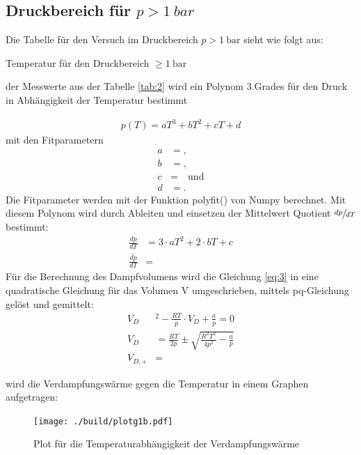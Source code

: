 \subsection{Druckbereich für $p > \SI{1}{bar}$}

Die Tabelle für den Versuch im Druckbereich $p> \SI{1}{\bar} $ sieht wie folgt aus:

\begin{table}[H]
    \centering
    
    \caption{Temperatur für den Druckbereich $\geq \SI{1}{\bar}$}
    \label{tab:2}
\end{table}

\justifying der Messwerte aus der Tabelle \ref{tab:2} wird ein Polynom
3.Grades für den Druck in Abhängigkeit der Temperatur bestimmt

\begin{align}
    p(T)= aT^3 +bT^2 +cT +d
\end{align}
mit den Fitparametern
\begin{align}
    a &= \text{},\\
    b &= \text{},\\
    c &= \text{} \quad \text{und}\\
    d &= \text{} .
\end{align}
Die Fitparameter werden mit der Funktion polyfit() von Numpy \cite{numpy} berechnet.
Mit diesem Polynom wird durch Ableiten und einsetzen der Mittelwert Quotient $\sfrac{dp}{dT}$ bestimmt:
\begin{align} 
    \frac{dp}{dT}&= 3\cdot a T^2+2\cdot b T+c\\
    \overline{\frac{dp}{dT}}&= \text{}
\end{align}
Für die Berechnung des Dampfvolumens wird die Gleichung \eqref{eq:3} in eine 
quadratische Gleichung für das Volumen V umgeschrieben, mittels pq-Gleichung gelöst
und gemittelt:
\begin{align}
    V_D&^2-\frac{RT}{p}\cdot V_D+\frac{a}{p}=0\\
    V_D&= \frac{RT}{2p} \pm \sqrt{\frac{R^2T^2}{4p^2} -\frac{a}{p} }\\
    V_{D,+}&= \text{} 
\end{align}

\justifying wird die Verdampfungswärme gegen die Temperatur in einem Graphen aufgetragen:

\begin{figure}[H]
    \centering
    \texttt{[image: ./build/plotg1b.pdf]}
    \caption{Plot für die Temperaturabhängigkeit der Verdampfungswärme}
    \label{fig:5}
\end{figure}


